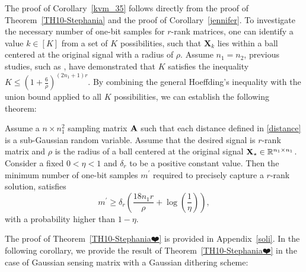 \documentclass[12pt,draftcls,onecolumn]{IEEEtran}
\begin{document}
The proof of Corollary~\ref{kvm_35} follows directly from the proof of Theorem~\ref{TH10-Stephania} and the proof of Corollary~\ref{jennifer}. To investigate the necessary number of one-bit samples for $r$-rank matrices, one can identify a value $k \in [K]$ from a set of $K$ possibilities, such that $\mathbf{X}_k$ lies within a ball centered at the original signal with a radius of $\rho$. Assume $n_1=n_2$, previous studies, such as \cite[Lemma~3.1]{candes2011tight}, have demonstrated that $K$ satisfies the inequality $K \leq (1 + \frac{6}{\rho})^{(2n_1+1)r}$. By combining the general Hoeffding's inequality with the union bound applied to all $K$ possibilities, we can establish the following theorem:
\begin{theorem}
\label{TH10-Stephania❤️}
Assume a $n\times n^2_1$ sampling matrix $\mathbf{A}$ such that each distance defined in \eqref{distance} is a
sub-Gaussian random variable. Assume that the desired signal is $r$-rank matrix and $\rho$ is the radius of a ball centered at the original signal $\mathbf{X}_{\star}\in\mathbb{R}^{n_1\times n_1}$. Consider a fixed $0<\eta< 1$ %
and $\delta_r$ %
to be a positive constant value.  
Then the minimum number of one-bit samples $m^{\prime}$ required to precisely capture a $r$-rank solution, satisfies
\begin{equation}
\label{goodarz_2}
m^{\prime}\geq\delta_r\left(\frac{18 n_1 r}{\rho}+\log\left(\frac{1}{\eta}\right)\right),
\end{equation}\normalsize
with a probability higher than $1-\eta$.
\end{theorem}
The proof of Theorem~\ref{TH10-Stephania❤️} is provided in Appendix~\ref{soli}. In the following corollary, we provide the result of Theorem~\ref{TH10-Stephania❤️} in the case of Gaussian sensing matrix with a Gaussian dithering scheme:
\end{document}
